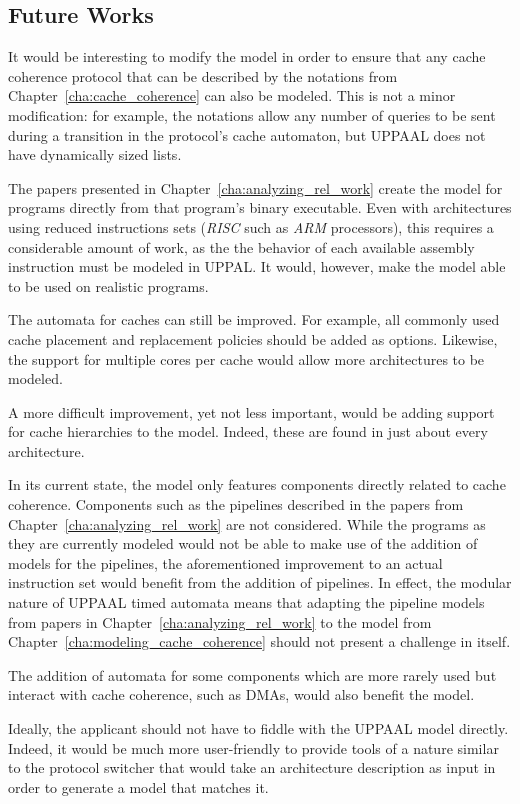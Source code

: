 \subsection{Future Works}
It would be interesting to modify the model in order to ensure that any cache
coherence protocol that can be described by the notations from
Chapter~\ref{cha:cache_coherence} can also be modeled. This is not a minor
modification: for example, the notations allow any number of queries to be sent
during a transition in the protocol's cache automaton, but UPPAAL does not have
dynamically sized lists.

The papers presented in Chapter~\ref{cha:analyzing_rel_work} create the model
for programs directly from that program's binary executable. Even with
architectures using reduced instructions sets (\textit{RISC} such as
\textit{ARM} processors), this requires a considerable amount of work, as the
the behavior of each available assembly instruction must be modeled in UPPAL.
It would, however, make the model able to be used on realistic programs.

The automata for caches can still be improved. For example, all commonly used
cache placement and replacement policies should be added as options. Likewise,
the support for multiple cores per cache would allow more architectures to be
modeled.

A more difficult improvement, yet not less important, would
be adding support for cache hierarchies to the model. Indeed, these are found in
just about every architecture.

In its current state, the model only features components directly related to
cache coherence. Components such as the pipelines described in the papers from
Chapter~\ref{cha:analyzing_rel_work} are not considered. While the programs as
they are currently modeled would not be able to make use of the addition of
models for the pipelines, the aforementioned improvement to an actual
instruction set would benefit from the addition of pipelines. In effect, the
modular nature of UPPAAL timed automata means that adapting the pipeline models
from papers in Chapter~\ref{cha:analyzing_rel_work} to the model from
Chapter~\ref{cha:modeling_cache_coherence} should not present a challenge in
itself.

The addition of automata for some components which are more rarely used but
interact with cache coherence, such as DMAs, would also benefit the model.

Ideally, the applicant should not have to fiddle with the UPPAAL model directly.
Indeed, it would be much more user-friendly to provide tools of a nature similar
to the protocol switcher that would take an architecture description as input
in order to generate a model that matches it.
